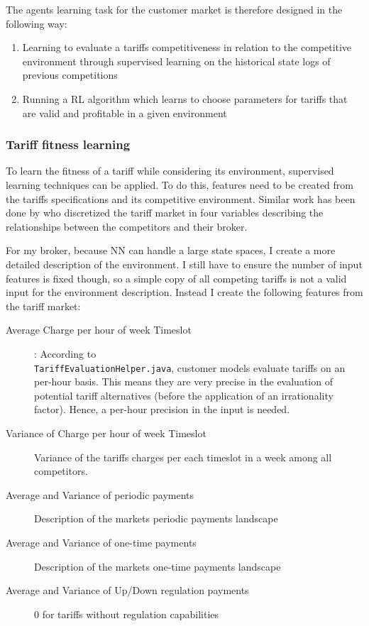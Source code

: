 The agents learning task for the customer market is therefore designed in the following way:

\begin{enumerate}
    \item Learning to evaluate a tariffs competitiveness in relation to the competitive environment through supervised
        learning on the historical state logs of previous competitions 
    \item Running a \ac {RL} algorithm which learns to choose parameters for tariffs that are valid and profitable in a
        given environment
\end{enumerate}

\subsubsection{Tariff fitness learning}
To learn the fitness of a tariff while considering its environment, supervised learning techniques can be applied. To do
this, features need to be created from the tariffs specifications and its competitive environment. Similar work has been
done by \citep{cuevas2015distributed} who discretized the tariff market in four variables describing the
relationships between the competitors and their broker.   

For my broker, because \ac {NN} can handle a large state spaces, I create a more detailed description of the
environment. I still have to ensure the number of input features is fixed though, so a simple copy of all competing
tariffs is not a valid input for the environment description. Instead I create the following features from the tariff
market:

\begin{description}
    \item[Average Charge per hour of week Timeslot]: According to \\ \texttt{TariffEvaluationHelper.java}, customer
        models evaluate tariffs on an per-hour basis. This means they are very precise in the evaluation of potential
        tariff alternatives (before the application of an irrationality factor). Hence, a per-hour precision in the
        input is needed.
    \item[Variance of Charge per hour of week Timeslot] Variance of the tariffs charges per each timeslot in a week
        among all competitors.
    \item[Average and Variance of periodic payments] Description of the markets periodic payments landscape
    \item[Average and Variance of one-time payments] Description of the markets one-time payments landscape
    \item[Average and Variance of Up/Down regulation payments] 0 for tariffs without regulation capabilities
\end{description}

